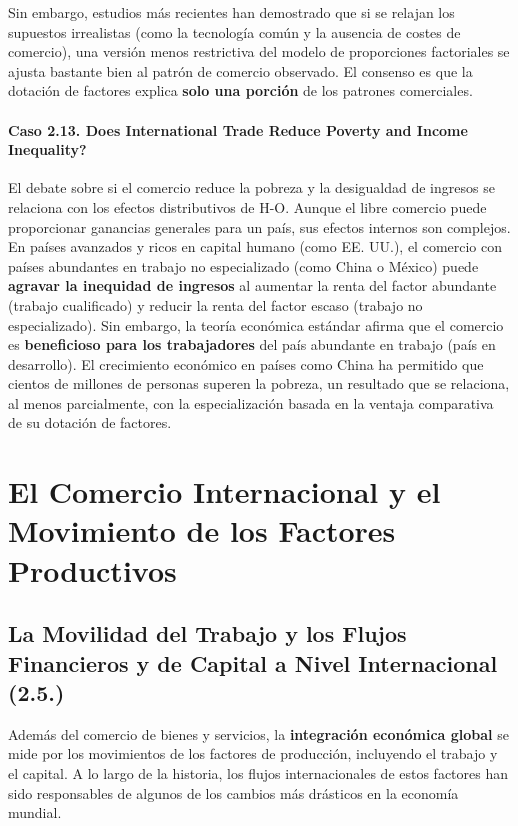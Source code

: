 Sin embargo, estudios más recientes han demostrado que si se relajan los supuestos irrealistas (como la tecnología común y la ausencia de costes de comercio), una versión menos restrictiva del modelo de proporciones factoriales se ajusta bastante bien al patrón de comercio observado. El consenso es que la dotación de factores explica \textbf{solo una porción} de los patrones comerciales.

\subsubsection{Caso 2.13. Does International Trade Reduce Poverty and Income Inequality?}
El debate sobre si el comercio reduce la pobreza y la desigualdad de ingresos se relaciona con los efectos distributivos de H-O. Aunque el libre comercio puede proporcionar ganancias generales para un país, sus efectos internos son complejos. En países avanzados y ricos en capital humano (como EE. UU.), el comercio con países abundantes en trabajo no especializado (como China o México) puede \textbf{agravar la inequidad de ingresos} al aumentar la renta del factor abundante (trabajo cualificado) y reducir la renta del factor escaso (trabajo no especializado). Sin embargo, la teoría económica estándar afirma que el comercio es \textbf{beneficioso para los trabajadores} del país abundante en trabajo (país en desarrollo). El crecimiento económico en países como China ha permitido que cientos de millones de personas superen la pobreza, un resultado que se relaciona, al menos parcialmente, con la especialización basada en la ventaja comparativa de su dotación de factores.

\chapter{El Comercio Internacional y el Movimiento de los Factores Productivos}

\section{La Movilidad del Trabajo y los Flujos Financieros y de Capital a Nivel Internacional (2.5.)}
Además del comercio de bienes y servicios, la \textbf{integración económica global} se mide por los movimientos de los factores de producción, incluyendo el trabajo y el capital. A lo largo de la historia, los flujos internacionales de estos factores han sido responsables de algunos de los cambios más drásticos en la economía mundial.

